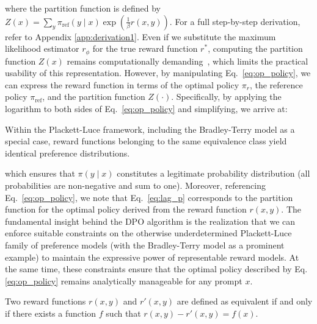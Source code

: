 where the partition function is defined by $Z(x) =\sum_{y}\pi_\text{ref}(y\mid x)\exp\left(\frac{1}{\beta}r(x, y)\right)$. For a full step-by-step derivation, refer to Appendix \ref{app:derivation1}. Even if we substitute the maximum likelihood estimator $r_{\phi}$ for the true reward function $r^*$, computing the partition function $Z(x)$ remains computationally demanding~\citep{korbak2022reinforcement, go2023aligning}, which limits the practical usability of this representation. However, by manipulating Eq.~\ref{eq:op_policy}, we can express the reward function in terms of the optimal policy $\pi_r$, the reference policy $\pi_\text{ref}$, and the partition function $Z(\cdot)$. Specifically, by applying the logarithm to both sides of Eq.~\ref{eq:op_policy} and simplifying, we arrive at:

\begin{lemma}\label{lemma:same_prefrence} Within the Plackett-Luce framework, including the Bradley-Terry model as a special case, reward functions belonging to the same equivalence class yield identical preference distributions.
\end{lemma}

which ensures that $\pi(y\mid x)$ constitutes a legitimate probability distribution (all probabilities are non-negative and sum to one). Moreover, referencing Eq.~\ref{eq:op_policy}, we note that Eq.~\ref{eq:lag_p} corresponds to the partition function for the optimal policy derived from the reward function $r(x, y)$. The fundamental insight behind the DPO algorithm is the realization that we can enforce suitable constraints on the otherwise underdetermined Plackett-Luce family of preference models (with the Bradley-Terry model as a prominent example) to maintain the expressive power of representable reward models. At the same time, these constraints ensure that the optimal policy described by Eq. \ref{eq:op_policy} remains analytically manageable for any prompt $x$.

\begin{definition}
Two reward functions $r(x, y)$ and $r'(x, y)$ are defined as equivalent if and only if there exists a function $f$ such that $r(x, y)-r'(x, y) = f(x)$.     
\end{definition}

